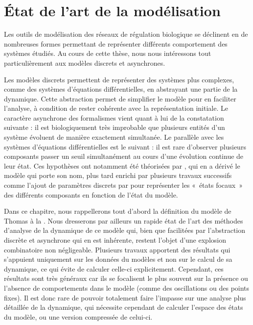 
\chapter{État de l'art de la modélisation}




Les outils de modélisation des réseaux de régulation biologique se déclinent en de nombreuses
formes permettant de représenter différents comportement des systèmes étudiés.
Au cours de cette thèse, nous nous intéressons tout particulièrement aux modèles discrets
et asynchrones.

Les modèles discrets permettent de représenter des systèmes plus complexes,
comme des systèmes d'équations différentielles,
en abstrayant une partie de la dynamique.
Cette abstraction permet de simplifier le modèle pour en faciliter l'analyse,
à condition de rester cohérente avec la représentation initiale.
Le caractère asynchrone des formalismes vient quant à lui de la constatation suivante :
il est biologiquement très improbable que plusieurs entités d'un système
évoluent de manière exactement simultanée.
Le parallèle avec les systèmes d'équations différentielles est le suivant :
il est rare d'observer plusieurs composants passer un seuil simultanément
au cours d'une évolution continue de leur état.
Ces hypothèses ont notamment été théorisées par ,
qui en a dérivé le modèle qui porte son nom,
plus tard enrichi par plusieurs travaux successifs
comme l'ajout de paramètres discrets par 
pour représenter les «~états focaux~» des différents
composants en fonction de l'état du modèle.

Dans ce chapitre, nous rappellerons tout d'abord la définition du modèle de Thomas
à la .
Nous dresserons par ailleurs un rapide état de l'art des méthodes d'analyse
de la dynamique de ce modèle qui, bien que facilitées par
l'abstraction discrète et asynchrone qui en est inhérente,
restent l'objet d'une explosion combinatoire non négligeable.
Plusieurs travaux apportent des résultats qui s'appuient uniquement sur les données
du modèles et non sur le calcul de sa dynamique,
ce qui évite de calculer celle-ci explicitement.
Cependant, ces résultats sont très généraux
car ils se focalisent le plus souvent sur la présence ou l'absence de comportements
dans le modèle (comme des oscillations ou des points fixes).
Il est donc rare de pouvoir totalement faire l'impasse
sur une analyse plus détaillée de la dynamique,
qui nécessite cependant de calculer l'espace des états du modèle,
ou une version compressée de celui-ci.

